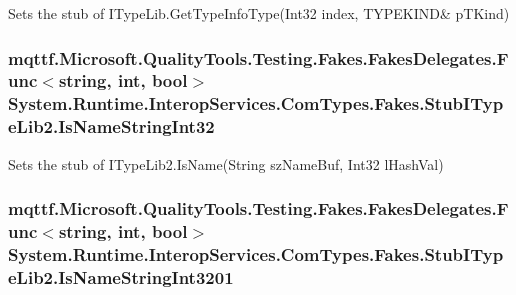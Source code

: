 Sets the stub of I\-Type\-Lib.\-Get\-Type\-Info\-Type(Int32 index, T\-Y\-P\-E\-K\-I\-N\-D\& p\-T\-Kind)

\hypertarget{class_system_1_1_runtime_1_1_interop_services_1_1_com_types_1_1_fakes_1_1_stub_i_type_lib2_a0891ef94b17fd0c1e78df3d76487dfb5}{
\subsubsection[{Is\-Name\-String\-Int32}]{\setlength{\rightskip}{0pt plus 5cm}mqttf.\-Microsoft.\-Quality\-Tools.\-Testing.\-Fakes.\-Fakes\-Delegates.\-Func$<$string, int, bool$>$ System.\-Runtime.\-Interop\-Services.\-Com\-Types.\-Fakes.\-Stub\-I\-Type\-Lib2.\-Is\-Name\-String\-Int32}}\label{class_system_1_1_runtime_1_1_interop_services_1_1_com_types_1_1_fakes_1_1_stub_i_type_lib2_a0891ef94b17fd0c1e78df3d76487dfb5}


Sets the stub of I\-Type\-Lib2.\-Is\-Name(\-String sz\-Name\-Buf, Int32 l\-Hash\-Val)

\hypertarget{class_system_1_1_runtime_1_1_interop_services_1_1_com_types_1_1_fakes_1_1_stub_i_type_lib2_a6cb7a7e7ed9982cdefcac7b39c635d9c}{
\subsubsection[{Is\-Name\-String\-Int3201}]{\setlength{\rightskip}{0pt plus 5cm}mqttf.\-Microsoft.\-Quality\-Tools.\-Testing.\-Fakes.\-Fakes\-Delegates.\-Func$<$string, int, bool$>$ System.\-Runtime.\-Interop\-Services.\-Com\-Types.\-Fakes.\-Stub\-I\-Type\-Lib2.\-Is\-Name\-String\-Int3201}}\label{class_system_1_1_runtime_1_1_interop_services_1_1_com_types_1_1_fakes_1_1_stub_i_type_lib2_a6cb7a7e7ed9982cdefcac7b39c635d9c}


